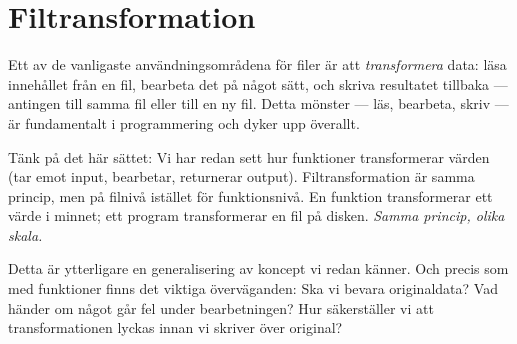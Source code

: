 \section{Filtransformation}

Ett av de vanligaste användningsområdena för filer är att \emph{transformera} data: läsa innehållet från en fil, bearbeta det på något sätt, och skriva resultatet tillbaka --- antingen till samma fil eller till en ny fil. Detta mönster --- läs, bearbeta, skriv --- är fundamentalt i programmering och dyker upp överallt.

Tänk på det här sättet: Vi har redan sett hur funktioner transformerar värden (tar emot input, bearbetar, returnerar output). Filtransformation är samma princip, men på filnivå istället för funktionsnivå. En funktion transformerar ett värde i minnet; ett program transformerar en fil på disken. \emph{Samma princip, olika skala.}

Detta är ytterligare en generalisering av koncept vi redan känner. Och precis som med funktioner finns det viktiga överväganden: Ska vi bevara originaldata? Vad händer om något går fel under bearbetningen? Hur säkerställer vi att transformationen lyckas innan vi skriver över original?

